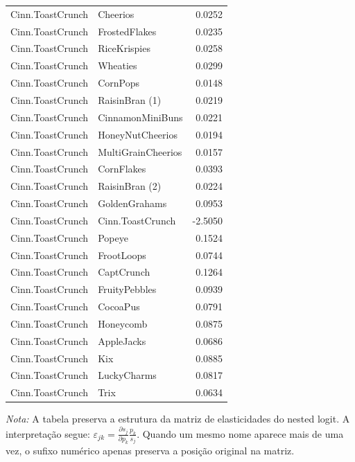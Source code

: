 \begin{table}[H]
\begin{tabular}{llr}
Cinn.ToastCrunch & Cheerios & 0.0252 \\
Cinn.ToastCrunch & FrostedFlakes & 0.0235 \\
Cinn.ToastCrunch & RiceKrispies & 0.0258 \\
Cinn.ToastCrunch & Wheaties & 0.0299 \\
Cinn.ToastCrunch & CornPops & 0.0148 \\
Cinn.ToastCrunch & RaisinBran (1) & 0.0219 \\
Cinn.ToastCrunch & CinnamonMiniBuns & 0.0221 \\
Cinn.ToastCrunch & HoneyNutCheerios & 0.0194 \\
Cinn.ToastCrunch & MultiGrainCheerios & 0.0157 \\
Cinn.ToastCrunch & CornFlakes & 0.0393 \\
Cinn.ToastCrunch & RaisinBran (2) & 0.0224 \\
Cinn.ToastCrunch & GoldenGrahams & 0.0953 \\
Cinn.ToastCrunch & Cinn.ToastCrunch & -2.5050 \\
Cinn.ToastCrunch & Popeye & 0.1524 \\
Cinn.ToastCrunch & FrootLoops & 0.0744 \\
Cinn.ToastCrunch & CaptCrunch & 0.1264 \\
Cinn.ToastCrunch & FruityPebbles & 0.0939 \\
Cinn.ToastCrunch & CocoaPus & 0.0791 \\
Cinn.ToastCrunch & Honeycomb & 0.0875 \\
Cinn.ToastCrunch & AppleJacks & 0.0686 \\
Cinn.ToastCrunch & Kix & 0.0885 \\
Cinn.ToastCrunch & LuckyCharms & 0.0817 \\
Cinn.ToastCrunch & Trix & 0.0634 \\
\bottomrule
\end{tabular}

\vspace{0.3em}
\footnotesize
\textit{Nota:} A tabela preserva a estrutura da matriz de elasticidades do nested logit. A interpretação segue: $\varepsilon_{jk}=\frac{\partial s_j}{\partial p_k}\frac{p_k}{s_j}$. Quando um mesmo nome aparece mais de uma vez, o sufixo numérico apenas preserva a posição original na matriz.
\end{table}
\endgroup


